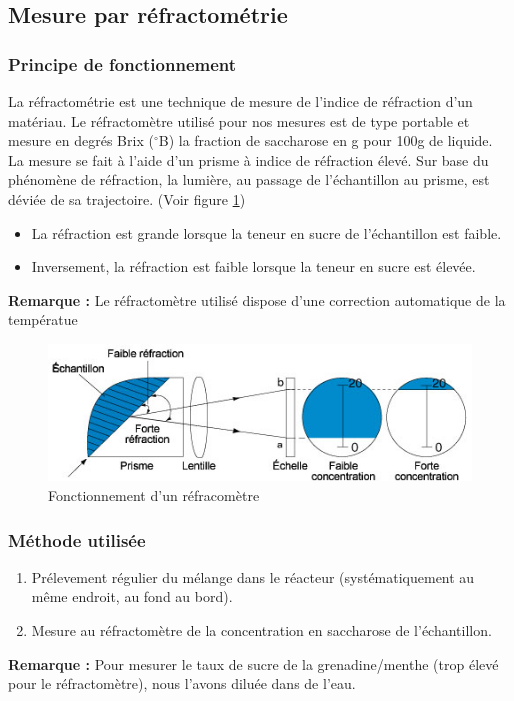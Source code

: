 \documentclass[a4paper,11pt, french]{article}
\begin{document}
	\subsection{Mesure par réfractométrie}
		\subsubsection{Principe de fonctionnement}
			La réfractométrie est une technique de mesure de l'indice de réfraction d'un matériau. Le réfractomètre utilisé pour nos mesures est de type portable et mesure en degrés Brix ($^{\circ}$B) la fraction de saccharose en g pour 100g de liquide. La mesure se fait à l'aide d'un prisme à indice de réfraction élevé. Sur base du phénomène de réfraction, la lumière, au passage de l'échantillon au prisme, est déviée de sa trajectoire. (Voir figure \ref{refractometrie})
			\begin{itemize}
				\item La réfraction est grande lorsque la teneur en sucre de l'échantillon est faible.
				\item Inversement, la réfraction est faible lorsque la teneur en sucre est élevée.
			\end{itemize}
			\textbf{Remarque :} Le réfractomètre utilisé dispose d'une correction automatique de la températue
			\begin{figure}[h]
				\centering
				\includegraphics[width=1.0\textwidth]{pictures/refractometre.jpg}
				\caption{Fonctionnement d'un réfracomètre\label{refractometrie}\protect\footnotemark}
			\end{figure}
		\subsubsection{Méthode utilisée}
			\begin{enumerate}
				\item Prélevement régulier du mélange dans le réacteur (systématiquement au même endroit, au fond au bord).
				\item Mesure au réfractomètre de la concentration en saccharose de l'échantillon.
			\end{enumerate}
			\textbf{Remarque :} Pour mesurer le taux de sucre de la grenadine/menthe (trop élevé pour le réfractomètre), nous l'avons diluée dans de l'eau.
\end{document}
